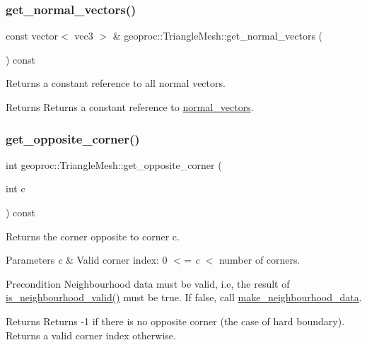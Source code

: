 \subsubsection{\texorpdfstring{get\+\_\+normal\+\_\+vectors()}{get\_normal\_vectors()}}
{\footnotesize\ttfamily const vector$<$ vec3 $>$ \& geoproc\+::\+Triangle\+Mesh\+::get\+\_\+normal\+\_\+vectors (\begin{DoxyParamCaption}{ }\end{DoxyParamCaption}) const}



Returns a constant reference to all normal vectors. 

\begin{DoxyReturn}{Returns}
Returns a constant reference to \hyperlink{classgeoproc_1_1TriangleMesh_ab9030a0301b2fe5868ad6c08692cce09}{normal\+\_\+vectors}. 
\end{DoxyReturn}
\mbox{\label{classgeoproc_1_1TriangleMesh_a0ea38352c56a76d6def1fce67253f433}} 
\subsubsection{\texorpdfstring{get\+\_\+opposite\+\_\+corner()}{get\_opposite\_corner()}}
{\footnotesize\ttfamily int geoproc\+::\+Triangle\+Mesh\+::get\+\_\+opposite\+\_\+corner (\begin{DoxyParamCaption}\item[{int}]{c }\end{DoxyParamCaption}) const}



Returns the corner opposite to corner c. 


\begin{DoxyParams}{Parameters}
{\em c} & Valid corner index\+: 0 $<$= {\itshape c} $<$ number of corners. \\
\hline
\end{DoxyParams}
\begin{DoxyPrecond}{Precondition}
Neighbourhood data must be valid, i.\+e, the result of \hyperlink{classgeoproc_1_1TriangleMesh_aa6f95b95709a72a14a15638bfeeed3f9}{is\+\_\+neighbourhood\+\_\+valid()} must be true. If false, call \hyperlink{classgeoproc_1_1TriangleMesh_a84003dfdfd5e591c00f01a797578ff1f}{make\+\_\+neighbourhood\+\_\+data}. 
\end{DoxyPrecond}
\begin{DoxyReturn}{Returns}
Returns -\/1 if there is no opposite corner (the case of hard boundary). Returns a valid corner index otherwise. 
\end{DoxyReturn}
\mbox{\label{classgeoproc_1_1TriangleMesh_a8a07f19f9d81952752d9c8973a2eb011}} 
